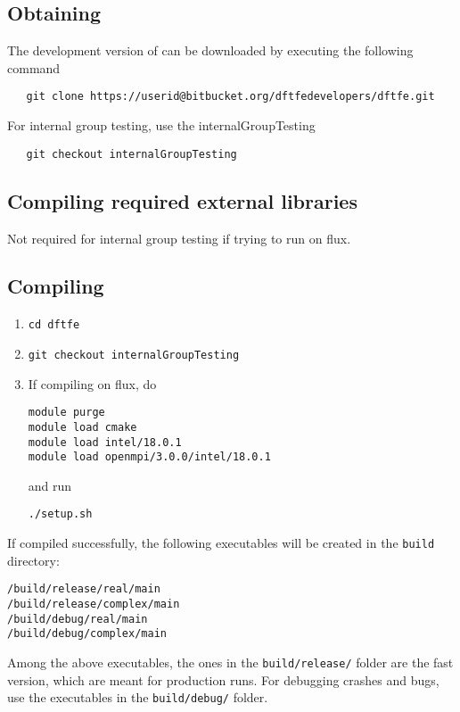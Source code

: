 \subsection{Obtaining \dftfe{}}
The development version of \dftfe{} can be downloaded by executing the following command
\begin{verbatim}
   git clone https://userid@bitbucket.org/dftfedevelopers/dftfe.git
\end{verbatim}
For internal group testing, use the internalGroupTesting
\begin{verbatim}
   git checkout internalGroupTesting
\end{verbatim}

\subsection{Compiling required external libraries}
Not required for internal group testing if trying to run \dftfe{} on flux.

\subsection{Compiling \dftfe{}}
\begin{enumerate}
\item   \begin{verbatim}
cd dftfe
\end{verbatim}
\item \begin{verbatim}
git checkout internalGroupTesting
\end{verbatim}
\item  If compiling on flux, do
\begin{verbatim}
module purge
module load cmake
module load intel/18.0.1
module load openmpi/3.0.0/intel/18.0.1
\end{verbatim}
and run
\begin{verbatim}
./setup.sh
\end{verbatim} 
\end{enumerate}
If \dftfe{} compiled successfully, the following executables will be created in the \verb|build| directory:
\begin{verbatim}
/build/release/real/main
/build/release/complex/main
/build/debug/real/main
/build/debug/complex/main
\end{verbatim}
Among the above executables, the ones in the \verb|build/release/| folder are the fast version, which are meant for production runs. For debugging crashes and bugs, use the executables in the \verb|build/debug/| folder. 
